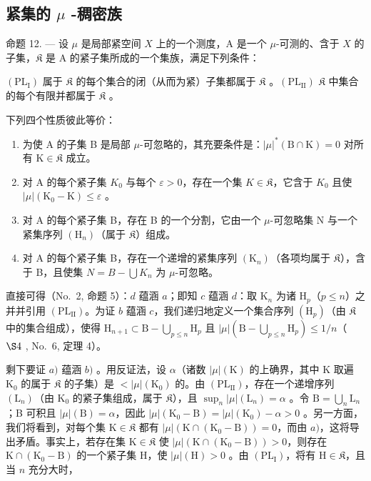 \subsection{\texorpdfstring{紧集的 \(\mu\) -稠密族}{紧集的 mu -稠密族}}

命题 12. --- 设 \(\mu\) 是局部紧空间 \(X\) 上的一个测度，A 是一个 \(\mu\)-可测的、含于 \(X\) 的子集，\(\mathfrak{K}\) 是 A 的紧子集所成的一个集族，满足下列条件：

\((\mathrm{PL}_{\mathrm{I}})\) 属于 \(\mathfrak{K}\) 的每个集合的闭（从而为紧）子集都属于 \(\mathfrak{K}\) 。\((\mathrm{PL}_{\mathrm{II}})\) \(\mathfrak{K}\) 中集合的每个有限并都属于 \(\mathfrak{K}\) 。

下列四个性质彼此等价：

\begin{enumerate}
\def\labelenumi{\alph{enumi})}
\item
  为使 A 的子集 B 是局部 \(\mu\)-可忽略的，其充要条件是：\(|\mu|^*(\mathrm{B} \cap \mathrm{K}) = 0\) 对所有 \(\mathrm{K} \in \mathfrak{K}\) 成立。
\item
  对 A 的每个紧子集 \(K_{0}\) 与每个 \(\varepsilon > 0\)，存在一个集 \(K \in \mathfrak{K}\)，它含于 \(K_{0}\) 且使 \(|\mu|(\mathrm{K}_{0} - \mathrm{K}) \leqslant \varepsilon\) 。
\item
  对 A 的每个紧子集 B，存在 B 的一个分割，它由一个 \(\mu\)-可忽略集 N 与一个紧集序列 \((\mathrm{H}_{n})\)（属于 \(\mathfrak{K}\)）组成。
\item
  对 A 的每个紧子集 B，存在一个递增的紧集序列 \((\mathrm{K}_{n})\)（各项均属于 \(\mathfrak{K}\)），含于 B，且使集 \(N = B - \bigcup K_{n}\) 为 \(\mu\)-可忽略。
\end{enumerate}

直接可得（No.~2, 命题 5）：\(d\) 蕴涵 \(a\)；即知 \(c\) 蕴涵 \(d\)：取 \(\mathrm{K}_n\) 为诸 \(\mathrm{H}_p\)（\(p \leqslant n\)）之并并引用 \((\mathrm{PL}_{\mathrm{II}})\)。为证 \(b\) 蕴涵 \(c\)，我们递归地定义一个集合序列 \((\mathrm{H}_p)\)（由 \(\mathfrak{K}\) 中的集合组成），使得 \(\mathrm{H}_{n+1} \subset \mathrm{B} - \bigcup_{p \leqslant n} \mathrm{H}_p\) 且 \(|\mu| (\mathrm{B} - \bigcup_{p \leqslant n} \mathrm{H}_p) \leqslant 1/n\)（ \(\S 4\) , No.~6, 定理 4）。

剩下要证 \(a)\) 蕴涵 \(b)\) 。用反证法，设 \(\alpha\)（诸数 \(|\mu|(\mathrm{K})\) 的上确界，其中 K 取遍 \(\mathrm{K}_0\) 的属于 \(\mathfrak{K}\) 的子集）是 \(< |\mu|(\mathrm{K}_0)\) 的。由 \((\mathrm{PL}_{\mathrm{II}})\)，存在一个递增序列 \((\mathrm{L}_n)\)（由 \(\mathrm{K}_0\) 的紧子集组成，属于 \(\mathfrak{K}\)），且 \(\sup_n |\mu|(\mathrm{L}_n) = \alpha\) 。令 \(\mathrm{B} = \bigcup_n \mathrm{L}_n\)；B 可积且 \(|\mu|(\mathrm{B}) = \alpha\)，因此 \(|\mu|(\mathrm{K}_0 - \mathrm{B}) = |\mu|(\mathrm{K}_0) - \alpha > 0\) 。另一方面，我们将看到，对每个集 \(\mathrm{K} \in \mathfrak{K}\) 都有 \(|\mu|(\mathrm{K} \cap (\mathrm{K}_0 - \mathrm{B})) = 0\)，而由 \(a)\)，这将导出矛盾。事实上，若存在集 \(\mathrm{K} \in \mathfrak{K}\) 使 \(|\mu|(\mathrm{K} \cap (\mathrm{K}_0 - \mathrm{B})) > 0\)，则存在 \(\mathrm{K} \cap (\mathrm{K}_0 - \mathrm{B})\) 的一个紧子集 H，使 \(|\mu|(\mathrm{H}) > 0\) 。由 \((\mathrm{PL}_{\mathrm{I}})\)，将有 \(\mathrm{H} \in \mathfrak{K}\)，且当 \(n\) 充分大时，

